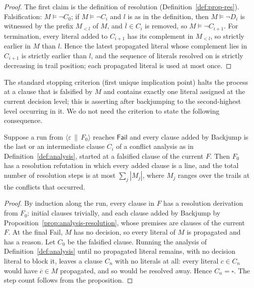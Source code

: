 \begin{proof}
The first claim is the definition of resolution (Definition~\ref{def:prop-res}). Falsification: $M\models\neg C_0$; if $M\models\neg C_i$ and $l$ is as in the definition, then $M\models\neg D_i$ is witnessed by the prefix $M_{<l}$ of $M$, and $\overline{l}\in C_i$ is removed, so $M\models\neg C_{i+1}$. For termination, every literal added to $C_{i+1}$ has its complement in $M_{<l}$, so strictly earlier in $M$ than $l$. Hence the latest propagated literal whose complement lies in $C_{i+1}$ is strictly earlier than $l$, and the sequence of literals resolved on is strictly decreasing in trail position; each propagated literal is used at most once.
\end{proof}

The standard stopping criterion (first unique implication point) halts the process at a clause that is falsified by $M$ and contains exactly one literal assigned at the current decision level; this is asserting after backjumping to the second-highest level occurring in it. We do not need the criterion to state the following consequence.

\begin{theorem}
\label{thm:cdcl-resolution}
Suppose a run from $\langle\varepsilon\,\|\,F_0\rangle$ reaches $\mathsf{Fail}$ and every clause added by \textsf{Backjump} is the last or an intermediate clause $C_i$ of a conflict analysis as in Definition~\ref{def:analysis}, started at a falsified clause of the current $F$. Then $F_0$ has a resolution refutation in which every added clause is a line, and the total number of resolution steps is at most $\sum_{j}|M_j|$, where $M_j$ ranges over the trails at the conflicts that occurred.
\end{theorem}

\begin{proof}
By induction along the run, every clause in $F$ has a resolution derivation from $F_0$: initial clauses trivially, and each clause added by \textsf{Backjump} by Proposition~\ref{prop:analysis-resolution}, whose premises are clauses of the current $F$. At the final \textsf{Fail}, $M$ has no decision, so every literal of $M$ is propagated and has a reason. Let $C_0$ be the falsified clause. Running the analysis of Definition~\ref{def:analysis} until no propagated literal remains, with no decision literal to block it, leaves a clause $C_n$ with no literals at all: every literal $c\in C_n$ would have $\overline{c}\in M$ propagated, and so would be resolved away. Hence $C_n=\square$. The step count follows from the proposition.
\end{proof}

